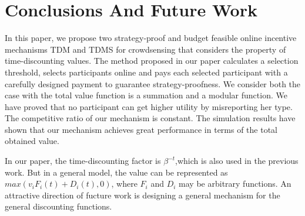 \documentclass[10pt,journal,letterpaper,compsoc]{IEEEtran}
\begin{document}
\section{Conclusions And Future Work}
In this paper, we propose two strategy-proof and budget feasible online incentive mechanisms TDM and TDMS for crowdsensing that considers the property of time-discounting values. The method proposed in our paper calculates a selection threshold, selects participants online and pays each selected participant with a carefully designed payment to guarantee strategy-proofness. We consider both the case with the total value function is a summation and a modular function. We have proved that no participant can get higher utility by misreporting her type. The competitive ratio of our mechanism is constant. The simulation results have shown that our mechanism achieves great performance in terms of the total obtained value.

In our paper, the time-discounting factor is $\beta^{-t}$,which is also used in the previous work. But in a general model, the value can be represented as $max(v_iF_i(t)+D_i(t),0)$, where $F_i$ and $D_i$ may be arbitrary functions. An attractive direction of fucture work is designing a general mechanism for the general discounting functions.




\end{document}
